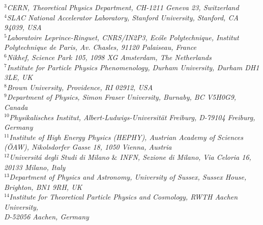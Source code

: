 \documentclass[11pt]{article}
\begin{document}
\begin{titlepage}
\begin{center}
           \textit{$^{3}$CERN, Theoretical Physics Department, CH-1211 Geneva 23, Switzerland } \\
           \textit{$^{4}$SLAC National Accelerator Laboratory, Stanford University, Stanford, CA 94039, USA } \\
           \textit{$^{5}$Laboratoire Leprince-Ringuet, CNRS/IN2P3, Ecóle Polytechnique, Institut Polytechnique de Paris, Av. Chasles, 91120 Palaiseau, France}\\
           \textit{$^{6}$Nikhef, Science Park 105, 1098 XG Amsterdam, The Netherlands }\\
           \textit{$^{7}$Institute for Particle Physics Phenomenology, Durham University, Durham DH1 3LE, UK}\\
           \textit{$^{8}$Brown University, Providence, RI 02912, USA} \\
           \textit{$^{9}$Department of Physics, Simon Fraser University, Burnaby, BC V5H0G9, Canada}\\
           \textit{$^{10}$Physikalisches Institut, Albert-Ludwigs-Universit\"at Freiburg, D-79104 Freiburg, Germany} \\
           \textit{$^{11}$Institute of High Energy Physics (HEPHY), Austrian Academy of Sciences (\"{O}AW), Nikolsdorfer Gasse 18, 1050 Vienna, Austria}\\
           \textit{$^{12}$Universit\'{a} degli Studi di Milano $\&$ INFN, Sezione di Milano, Via Celoria 16, 20133 Milano, Italy}\\
           \textit{$^{13}$Department of Physics and Astronomy, University of Sussex, Sussex House, Brighton, BN1 9RH, UK}\\
           \textit{$^{14}$Institute for Theoretical Particle Physics and Cosmology, RWTH Aachen University, \\D-52056 Aachen, Germany}\\
           

\end{center}
\end{titlepage}
\end{document}
